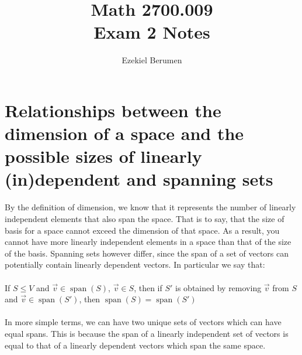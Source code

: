 \documentclass{report}
\title{\Huge{Math 2700.009}\\Exam 2 Notes}
\author{\huge{Ezekiel Berumen}}
\date{}
\begin{document}
\maketitle
\newpage%
\tableofcontents
\pagebreak

\section{Relationships between the dimension of a space and the possible sizes of linearly (in)dependent and spanning sets}
\noindent By the definition of dimension, we know that it represents the number of linearly independent elements that also span the space. That is to say, that the size of basis for a space cannot exceed the dimension of that space. As a result, you cannot have more linearly independent elements in a space than that of the size of the basis. Spanning sets however differ, since the span of a set of vectors can potentially contain linearly dependent vectors. In particular we say that: \\
\\
\noindent If $S\le V$ and $\vec{v}\in\operatorname{span}(S)$, $\vec{v}\in S$, then if $S'$ is obtained by removing $\vec{v}$ from $S$ and $\vec{v}\in\operatorname{span}(S')$, then $\operatorname{span}(S)=\operatorname{span}(S')$ \\
\\
\noindent In more simple terms, we can have two unique sets of vectors which can have equal spans. This is because the span of a linearly independent set of vectors is equal to that of a linearly dependent vectors which span the same space.
\end{document}
